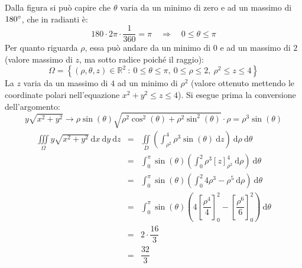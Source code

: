 \documentclass[a4paper]{article}
\begin{document}
	\noindent
	Dalla figura si può capire che $\theta$ varia da un minimo di zero e ad un massimo di $180\degree$, che in radianti è:
	\begin{equation*}
		180 \cdot 2\pi \cdot \dfrac{1}{360} = \pi \hspace{1em} \Longrightarrow \hspace{1em} 0 \le \theta \le \pi
	\end{equation*}
	Per quanto riguarda $\rho$, essa può andare da un minimo di $0$ e ad un massimo di $2$ (valore massimo di $z$, ma sotto radice poiché il raggio):
	\begin{equation*}
		\Omega = \left\{\left(\rho, \theta, z\right) \in \mathbb{R}^{2} \: : \: 0 \le \theta \le \pi, \: 0 \le \rho \le 2, \: \rho^{2} \le z \le 4\right\}
	\end{equation*}
	La $z$ varia da un massimo di $4$ ad un minimo di $\rho^{2}$ (valore ottenuto mettendo le coordinate polari nell'equazione $x^{2}+y^{2}\le z \le 4$). Si esegue prima la conversione dell'argomento:
	\begin{equation*}
		y\sqrt{x^{2}+y^{2}} \rightarrow \rho\sin\left(\theta\right) \sqrt{\rho^{2}\cos^{2}\left(\theta\right) + \rho^{2}\sin^{2}\left(\theta\right)} \cdot \rho = \rho^{3} \sin\left(\theta\right)
	\end{equation*}
	\begin{equation*}
		\begin{array}{rcl}
			\displaystyle\iiint\limits_{\Omega} y\sqrt{x^{2}+y^{2}} \:\mathrm{d}x\:\mathrm{d}y\:\mathrm{d}z
			&=&
			\displaystyle\iint\limits_{D} \left(\int_{\rho^{2}}^{4} \rho^{3} \sin\left(\theta\right) \:\mathrm{d}z\right) \:\mathrm{d}\rho\:\mathrm{d}\theta \\ [1.5em]
			&=&
			\displaystyle\int_{0}^{\pi} \sin\left(\theta\right) \left(\int_{0}^{2} \rho^{3} \left[z\right]_{\rho^{2}}^{4} \:\mathrm{d}\rho\right)\:\mathrm{d}\theta \\ [1.5em]
			&=&
			\displaystyle\int_{0}^{\pi} \sin\left(\theta\right) \left(\int_{0}^{2} 4\rho^{3} - \rho^{5} \:\mathrm{d}\rho\right)\:\mathrm{d}\theta \\ [1.5em]
			&=&
			\displaystyle\int_{0}^{\pi} \sin\left(\theta\right) \left(4\left[\dfrac{\rho^{4}}{4}\right]_{0}^{2} - \left[\dfrac{\rho^{6}}{6}\right]_{0}^{2}\right)\:\mathrm{d}\theta \\ [1.5em]
			&=&
			2 \cdot \dfrac{16}{3} \\ [.5em]
			&=&
			\dfrac{32}{3}
		\end{array}
	\end{equation*}
	
\end{document}
